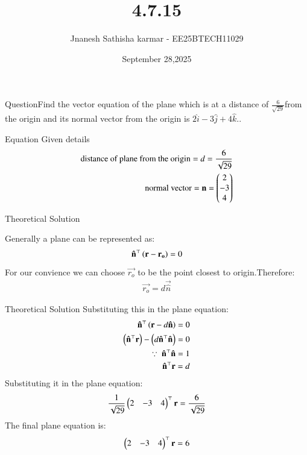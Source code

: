 \documentclass{beamer}
\title %
{4.7.15}
\date{September 28,2025}
\author 
{Jnanesh Sathisha karmar - EE25BTECH11029}
\begin{document}
\frame{\titlepage}
\begin{frame}{Question}Find the vector equation of the plane which is at a distance of $\frac{6}{\sqrt{29}}$from the origin and its normal vector from the origin is $2\hat{i}-3\hat{j}+4\hat{k}$..


\end{frame}



\begin{frame}{Equation}
Given details
\begin{align}
   \text{distance of plane from the origin}=d=\frac{6}{\sqrt
   {29}}\\
   \text{normal vector}=\mathbf{n}=\begin{pmatrix}2\\-3\\4\end{pmatrix}
\end{align}
\end{frame}
\begin{frame}{Theoretical Solution}

Generally a plane can be represented as:
\begin{align}
    \mathbf{\hat{n}}^{\top}\left(\mathbf{r}-\mathbf{r_o}\right)=0
\end{align}
For our convience we can choose $\vec{r_o}$ to be the point closest to origin.Therefore:
\begin{align}
   \vec{r_o}=d\vec{\hat{n}}
\end{align}

\end{frame}

\begin{frame}{Theoretical Solution}
Substituting this in the plane equation:
\begin{align}
    \mathbf{\hat{n}}^{\top}\left(\mathbf{r}-d\mathbf{\hat{n}}\right)=0\\
    \left(\mathbf{\hat{n}}^{\top}\mathbf{r}\right)-\left(d\mathbf{\hat{n}}^{\top}\mathbf{\hat{n}}\right)=0\\
    \because\ \mathbf{\hat{n}}^{\top}\mathbf{\hat{n}}=1\\
    \mathbf{\hat{n}}^{\top}\mathbf{r}=d
\end{align}
Substituting it in the plane equation:
\begin{align}
    \frac{1}{\sqrt{29}}\begin{pmatrix}2 & -3 & 4\end{pmatrix}^{\top}\mathbf{r}=\frac{6}{\sqrt{29}}
\end{align}
The final plane equation is:
\begin{align}
    \begin{pmatrix}2 & -3 & 4\end{pmatrix}^{\top}\mathbf{r}=6
\end{align}

\end{frame}
\end{document}
